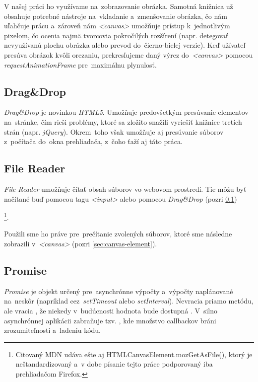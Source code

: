 V našej práci ho využívame na~zobrazovanie obrázka. Samotná knižnica už obsahuje potrebné nástroje na~vkladanie a~zmenšovanie obrázka, čo nám uľahčuje prácu a~zároveň nám \emph{<canvas>} umožňuje prístup k~jednotlivým pixelom, čo ocenia najmä tvorcovia pokročilých rozšírení (napr. detegovať nevyužívanú plochu obrázka alebo prevod do~čierno-bielej verzie). Keď užívateľ presúva obrázok kvôli orezaniu, prekresľujeme daný výrez do~\emph{<canvas>} pomocou \emph{requestAnimationFrame} \cite{MDN_RequestAnimationFrame} pre~maximálnu plynulosť.


\subsection{Drag\&Drop}
\label{sec:drag-n-drop}

\emph{Drag\&Drop} je novinkou \emph{HTML5}. Umožňuje predovšetkým presúvanie elementov na~stránke, čím rieši problémy, ktoré sa zložito snažili vyriešiť knižnice tretích strán (napr. \emph{jQuery}). Okrem~toho však umožňuje aj presúvanie súborov z~počítača do~okna prehliadača, z~čoho ťaží aj táto práca.


\subsection{File Reader}
\label{sec:file-reader}

\emph{File Reader} umožňuje čítať obsah súborov vo webovom prostredí. Tie môžu byť načítané buď pomocou tagu \emph{<input>} alebo pomocou \emph{Drag\&Drop} (pozri \ref{sec:drag-n-drop}) 

\cite{MDN_FileReader}\footnote{Citovaný MDN udáva ešte aj HTMLCanvasElement.mozGetAsFile(), ktorý je neštandardizovaný a~v dobe písanie tejto práce podporovaný iba prehliadačom Firefox.}.

Použili sme ho práve pre~prečítanie zvolených súborov, ktoré sme následne zobrazili v~\emph{<canvas>} (pozri \ref{sec:canvas-element}).


\subsection{Promise}

\emph{Promise} je objekt určený pre~asynchrónne výpočty a~výpočty naplánované na~neskôr (napríklad cez~\emph{setTimeout} alebo \emph{setInterval}). Nevracia priamo metódu, ale vracia , že niekedy v~budúcnosti hodnota bude dostupná \cite{MDN_Promise}. V~silno asynchrónnej aplikácii zabraňuje tzv. , kde množstvo callbackov bráni zrozumiteľnosti a~ladeniu kódu.

